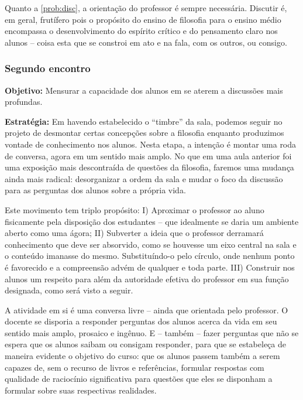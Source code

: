 \documentclass[12pt,a4paper]{article}
\newenvironment{citac}{
	\begin{addmargin}[4cm]{1em} \footnotesize}{\normalfont \end{addmargin}
}
\begin{document}
\begin{citac}
	Quanto a \ref{prob:disc}, a orientação do professor é sempre
	necessária. Discutir é, em geral, frutífero pois o propósito
	do ensino de filosofia para o ensino médio encompassa o 
	desenvolvimento do espírito crítico e do pensamento claro nos 
	alunos -- coisa esta que se constroi em ato e na fala, com os 
	outros, ou consigo.

	\subsubsection{Segundo encontro}

	\textbf{Objetivo:} Mensurar a capacidade dos alunos em se 
	aterem a discussões mais profundas. 

	\textbf{Estratégia:}
	Em havendo estabelecido o “timbre” da sala, podemos seguir no 
	projeto de desmontar certas concepções sobre a filosofia 
	enquanto produzimos vontade de conhecimento nos alunos. Nesta
	etapa, a intenção é montar uma roda de conversa, agora 
	em um sentido mais amplo. No que em uma aula anterior foi uma 
	exposição mais descontraída de questões da filosofia, faremos 
	uma mudança ainda mais radical: desorganizar a ordem da sala e 
	mudar o foco da discussão para as perguntas dos alunos sobre 
	a própria vida. 

	Este movimento tem triplo propósito: I) Aproximar o 
	professor ao aluno fisicamente pela disposição dos 
	estudantes -- que idealmente se daria um ambiente aberto como 
	uma ágora; II) Subverter a ideia que o professor 
	derramará conhecimento que deve ser absorvido, como se houvesse
	um eixo central na sala e o conteúdo imanasse do mesmo. 
	Substituíndo-o pelo círculo, onde nenhum ponto é favorecido e 
	a compreensão advém de qualquer e toda parte. III) 
	Construir nos alunos um respeito para além da autoridade efetiva
	do professor em sua função designada, como será visto a seguir.

	A atividade em si é uma conversa livre -- ainda que orientada 
	pelo professor. O docente se disporia a responder perguntas dos 
	alunos acerca da vida em seu sentido mais amplo, prosaico e 
	ingênuo. E -- também -- fazer perguntas que não se espera que 
	os alunos saibam ou consigam responder, para que se estabeleça 
	de maneira evidente o objetivo do curso: que os alunos passem 
	também a serem capazes de, sem o recurso de livros e referências,
	formular respostas com qualidade de raciocínio significativa 
	para questões que eles se disponham a formular sobre suas 
	respectivas realidades.
	

\end{citac}
\end{document}
